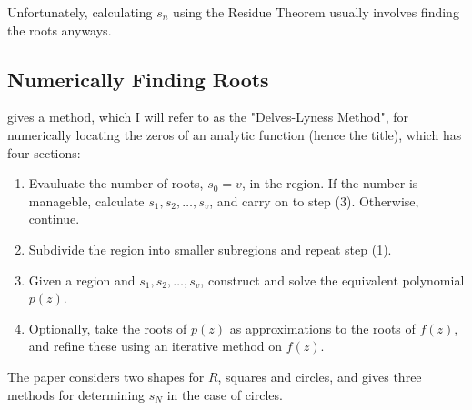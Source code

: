 \documentclass{article}
\begin{document}
Unfortunately, calculating $s_n$ using the Residue Theorem usually involves finding the roots anyways.

\subsection{Numerically Finding Roots}

\cite{delves1967numerical} gives a method, which I will refer to as the "Delves-Lyness Method", for numerically locating the zeros of an analytic function (hence the title),
which has four sections:
\begin{enumerate}
	\item Evauluate the number of roots, $s_0=v$, in the region.
	If the number is manageble, calculate $s_1,s_2,\dots,s_v$, and carry on to step (3).
	Otherwise, continue.
	\item
	Subdivide the region into smaller subregions and repeat step (1).
	\item Given a region and $s_1,s_2,\dots,s_v$, construct and solve the equivalent polynomial $p(z)$.
	\item Optionally, take the roots of $p(z)$ as approximations to the roots of $f(z)$,
	and refine these using an iterative method on $f(z)$.
\end{enumerate}
The paper considers two shapes for $R$, squares and circles, 
and  gives three methods for determining $s_N$ in the case of circles.



\printbibliography
\end{document}

